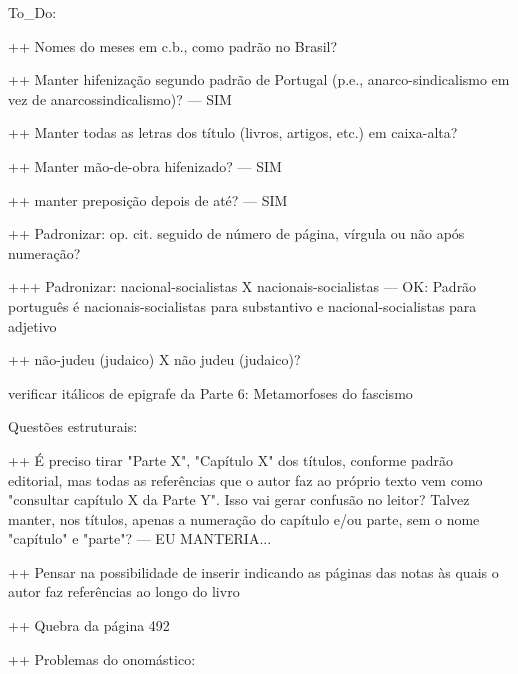 To_Do:

++ Nomes do meses em c.b., como padrão no Brasil?

++ Manter hifenização segundo padrão de Portugal (p.e., anarco-sindicalismo em vez de anarcossindicalismo)? --- SIM

++ Manter todas as letras dos título (livros, artigos, etc.) em caixa-alta?

++ Manter mão-de-obra hifenizado? --- SIM

++ manter preposição depois de até? --- SIM

++ Padronizar: op. cit. seguido de número de página, vírgula ou não após numeração?

+++ Padronizar: nacional-socialistas X nacionais-socialistas --- OK: Padrão português é nacionais-socialistas para substantivo e nacional-socialistas para adjetivo

++ não-judeu (judaico) X não judeu (judaico)?

verificar itálicos de epigrafe da Parte 6: Metamorfoses do fascismo

Questões estruturais:

++ É preciso tirar "Parte X", "Capítulo X" dos títulos, conforme padrão editorial, mas todas as referências que o autor faz ao próprio texto vem como "consultar capítulo X da Parte Y". Isso vai gerar confusão no leitor? Talvez manter, nos títulos, apenas a numeração do capítulo e/ou parte, sem o nome "capítulo" e "parte"? --- EU MANTERIA...

++ Pensar na possibilidade de inserir \pageref indicando as páginas das notas às quais o autor faz referências ao longo do livro 

++ Quebra da página 492

++ Problemas do onomástico:
